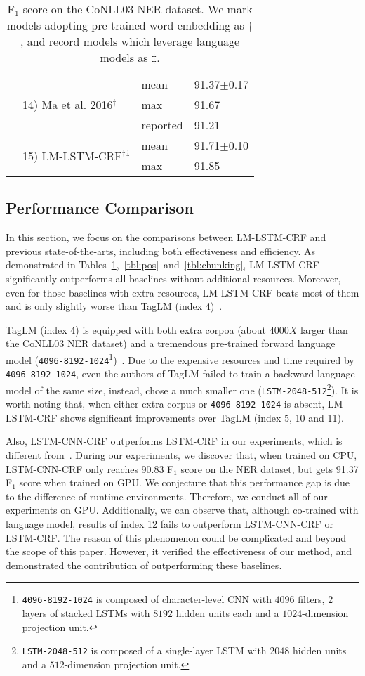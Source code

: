 \documentclass[letterpaper]{article} \usepackage{aaai18}  \usepackage{times}  \usepackage{helvet}  \usepackage{courier}  \usepackage{url}  \usepackage{graphicx}  \usepackage{multirow}
\newcommand{\our}{\textsc{LM-LSTM-CRF}\xspace}
\begin{document}
\begin{table}[t!]
{\begin{tabular}{c||l|l|l}
\cline{2-4}
& \multirow{3}{*}{14) Ma et al. 2016$^\dagger$} & mean & 91.37$\pm$0.17\\
\cline{3-4}
& & max & 91.67\\
\cline{3-4}
& & reported & 91.21\\
\cline{2-4}
& \multirow{2}{*}{15) \our$^\dagger$$^\ddagger$} & mean & 91.71$\pm$0.10 \\
\cline{3-4}
& & max & 91.85\\
\hline
\end{tabular}
}
\caption{F$_1$ score on the CoNLL03 NER dataset.
We mark models adopting pre-trained word embedding as $\dagger$, and record models which leverage language models as $\ddagger$.
}\label{tbl:ner}
\end{table}

\subsection{Performance Comparison}
In this section, we focus on the comparisons between \our and previous state-of-the-arts, including both effectiveness and efficiency.
As demonstrated in Tables~\ref{tbl:ner},~\ref{tbl:pos}~and~\ref{tbl:chunking}, \our significantly outperforms all baselines without additional resources. 
Moreover, even for those baselines with extra resources, \our beats most of them and is only slightly worse than TagLM (index 4)~\cite{peters2017semi}.

TagLM (index 4) is equipped with both extra corpoa (about $4000X$ larger than the CoNLL03 NER dataset) and a tremendous pre-trained forward language model (\texttt{4096-8192-1024}\footnote{\texttt{4096-8192-1024} is composed of character-level CNN with $4096$ filters, $2$ layers of stacked LSTMs with $8192$ hidden units each and a $1024$-dimension projection unit.})~\cite{jozefowicz2016exploring}.
Due to the expensive resources and time required by \texttt{4096-8192-1024}, even the authors of TagLM failed to train a backward language model of the same size, instead, chose a much smaller one (\texttt{LSTM-2048-512}\footnote{\texttt{LSTM-2048-512} is composed of a single-layer LSTM with $2048$ hidden units and a $512$-dimension projection unit.}).
It is worth noting that, when either extra corpus or \texttt{4096-8192-1024} is absent, \our shows significant improvements over TagLM (index 5, 10 and 11). 


Also, LSTM-CNN-CRF outperforms LSTM-CRF in our experiments, which is different from~\cite{reimers2017reporting}.
During our experiments, we discover that, when trained on CPU, LSTM-CNN-CRF only reaches 90.83 F$_1$ score on the NER dataset, but gets 91.37 F$_1$ score when trained on GPU.
We conjecture that this performance gap is due to the difference of runtime environments.
Therefore, we conduct all of our experiments on GPU. 
Additionally, we can observe that, although co-trained with language model, results of index 12 fails to outperform LSTM-CNN-CRF or LSTM-CRF.
The reason of this phenomenon could be complicated and beyond the scope of this paper.
However, it verified the effectiveness of our method, and demonstrated the contribution of outperforming these baselines.
\end{document}
